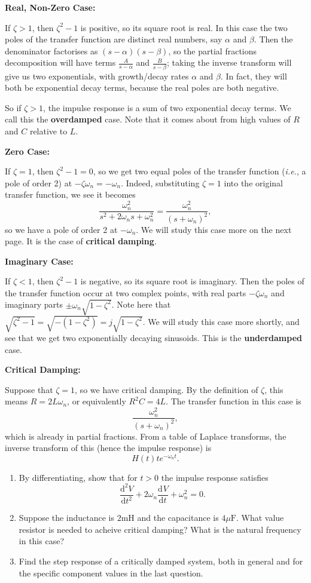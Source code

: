 \documentclass{article}
\newcommand{\deriv}[3][]{\frac{\mathrm{d}^{#1}#2}{\mathrm{d}#3^{#1}}}
\begin{document}
\textbf{Real, Non-Zero Case:}\smallskip

If $\zeta>1$, then $\zeta^2-1$ is positive, so its square root is real. In this case the two poles of the transfer function are distinct real numbers, say $\alpha$ and $\beta$. Then the denominator factorises as $(s-\alpha)(s-\beta)$, so the partial fractions decomposition will have terms $\frac{A}{s-\alpha}$ and $\frac{B}{s-\beta}$; taking the inverse transform will give us two exponentials, with growth/decay rates $\alpha$ and $\beta$. In fact, they will both be exponential decay terms, because the real poles are both negative.

So if $\zeta>1$, the impulse response is a sum of two exponential decay terms. We call this the \textbf{overdamped} case. Note that it comes about from high values of $R$ and $C$ relative to $L$.\bigskip


\textbf{Zero Case:}\smallskip

If $\zeta=1$, then $\zeta^2-1=0$, so we get two equal poles of the transfer function (\textit{i.e.}, a pole of order 2) at $-\zeta\omega_n=-\omega_n$. Indeed, substituting $\zeta=1$ into the original transfer function, we see it becomes
\[\frac{\omega_n^2}{s^2+2\omega_ns+\omega_n^2}=\frac{\omega_n^2}{(s+\omega_n)^2},\]
so we have a pole of order 2 at $-\omega_n$. We will study this case more on the next page. It is the case of \textbf{critical damping}.\bigskip


\textbf{Imaginary Case:}\smallskip

If $\zeta<1$, then $\zeta^2-1$ is negative, so its square root is imaginary. Then the poles of the transfer function occur at two complex points, with real parts $-\zeta\omega_n$ and imaginary parts $\pm\omega_n\sqrt{1-\zeta^2}$. Note here that $\sqrt{\zeta^2-1}=\sqrt{-(1-\zeta^2)}=j\sqrt{1-\zeta^2}$. We will study this case more shortly, and see that we get two exponentially decaying sinusoids. This is the \textbf{underdamped} case.


\clearpage


\textbf{Critical Damping:}\bigskip

Suppose that $\zeta=1$, so we have critical damping. By the definition of $\zeta$, this means $R=2L\omega_n$, or equivalently $R^2C=4L$. The transfer function in this case is
\[\frac{\omega_n^2}{(s+\omega_n)^2},\]
which is already in partial fractions. From a table of Laplace transforms, the inverse transform of this (hence the impulse response) is
\[H(t)te^{-\omega_n t}.\]

\begin{enumerate}
	\item By differentiating, show that for $t>0$ the impulse response satisfies
		\[\deriv[2]{V}{t}+2\omega_n\deriv{V}{t}+\omega_n^2=0.\]
	\item Suppose the inductance is $2\mathrm{mH}$ and the capacitance is $4\mu\mathrm{F}$. What value resistor is needed to acheive critical damping? What is the natural frequency in this case?
	\item Find the step response of a critically damped system, both in general and for the specific component values in the last question.
\end{enumerate}
\end{document}

